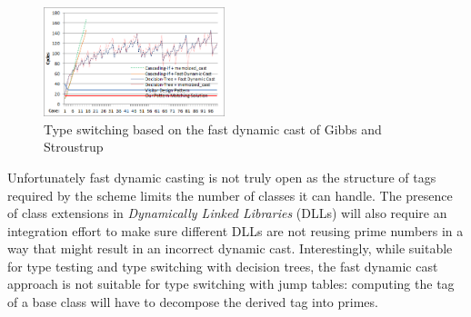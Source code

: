 \begin{figure}[htbp]
  \centering
    \includegraphics[width=0.47\textwidth]{DCast-vs-Visitors2.png}
  \caption{Type switching based on the fast dynamic cast of Gibbs and Stroustrup~\cite{FastDynCast}}
  \label{fig:DCastVis2}
\end{figure}


Unfortunately fast dynamic casting is not truly open as the structure of tags 
required by the scheme limits the number of classes it can handle. 
The presence of class extensions in \emph{Dynamically Linked Libraries} (DLLs) 
will also require an integration effort to make sure different DLLs are not 
reusing prime numbers in a way that might result in an incorrect dynamic cast.
Interestingly, while suitable for type testing and type switching with decision 
trees, the fast dynamic cast approach is not suitable for type switching with 
jump tables: computing the tag of a base class will have to decompose the 
derived tag into primes.



